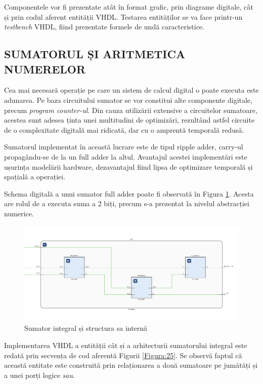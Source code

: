\documentclass[12pt]{article}
\begin{document}
Componentele vor fi prezentate atât în format grafic, prin diagrame digitale, cât și prin codul aferent entității VHDL. Testarea entităților se va face printr-un \textit{testbench} VHDL, fiind prezentate formele de undă caracteristice.

 \subsection{SUMATORUL ȘI ARITMETICA NUMERELOR}
 Cea mai necesară operație pe care un sistem de calcul digital o poate executa este adunarea. Pe baza circuitului sumator se vor constitui alte componente digitale, precum \textit{program counter-ul}. Din cauza utilizării extensive a circuitelor sumatoare, acestea sunt adesea ținta unei multitudini de optimizări, rezultând astfel circuite de o complexitate digitală mai ridicată, dar cu o amprentă temporală redusă.
 
Sumatorul implementat în această lucrare este de tipul ripple adder, carry-ul propagându-se de la un full adder la altul. Avantajul acestei implementări este ușurința modelării hardware, dezavantajul fiind lipsa de optimizare temporală și spațială a operației.

Schema digitală a unui sumator full adder poate fi observată în Figura \ref{Figura:16}. Acesta are rolul de a executa suma a 2 biți, precum s-a prezentat la nivelul abstracției numerice.

 \begin{figure}[h!]
 \includegraphics[width=1.03\textwidth]{fulladderVHDL.png}
 \centering
 \caption{Sumator integral și structura sa internă}
 \label{Figura:16}
 \end{figure}

Implementarea VHDL a entității cât și a arhitecturii sumatorului integral este redată prin secvența de cod aferentă Figurii \ref{Figura:25}. Se observă faptul că această entitate este construită prin relaționarea a două sumatoare pe jumătăți și a unei porți logice \textit{sau}.
\end{document}
